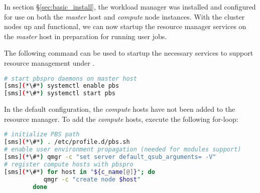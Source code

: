 
In section \S\ref{sec:basic_install}, the \rms{} workload manager was installed
and configured for use on both the {\em master} host and {\em compute} node
instances. With the cluster nodes up and functional, we can now startup the
resource manager services on the {\em master} host in preparation for running 
user jobs.

The following command can be used to startup the necessary services to support
resource management under \rms{}.

\begin{lstlisting}[language=bash,keywords={}]
# start pbspro daemons on master host
[sms](*\#*) systemctl enable pbs
[sms](*\#*) systemctl start pbs
\end{lstlisting}

In the default configuration, the {\em compute} hosts have not been added to 
the \rms{} resource manager. To add the {\em compute} hosts, execute 
the following for-loop:

\begin{lstlisting}[language=bash,keywords={}]
# initialize PBS path
[sms](*\#*) . /etc/profile.d/pbs.sh
# enable user environment propagation (needed for modules support)
[sms](*\#*) qmgr -c "set server default_qsub_arguments= -V"
# register compute hosts with pbspro
[sms](*\#*) for host in "${c_name[@]}"; do
           qmgr -c "create node $host"
        done
\end{lstlisting}

